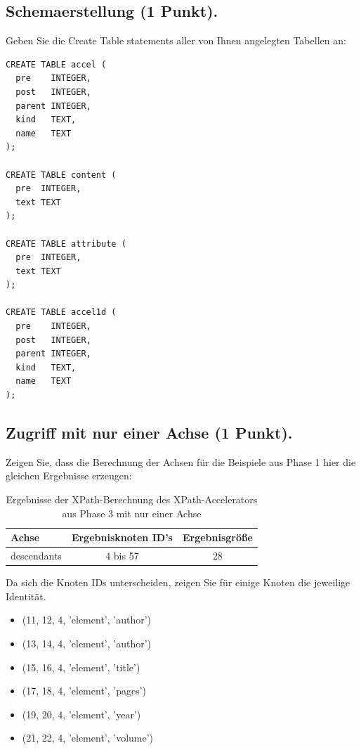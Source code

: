 \documentclass[11pt]{scrartcl}
\begin{document}
\newpage
\subsection*{Schemaerstellung (1 Punkt).}
Geben Sie die Create Table statements aller von Ihnen angelegten Tabellen an:
\begin{lstlisting}[style=dmrsql]
CREATE TABLE accel (
  pre    INTEGER,
  post   INTEGER,
  parent INTEGER,
  kind   TEXT,
  name   TEXT
);

CREATE TABLE content (
  pre  INTEGER,
  text TEXT
);

CREATE TABLE attribute (
  pre  INTEGER,
  text TEXT
);

CREATE TABLE accel1d (
  pre    INTEGER,
  post   INTEGER,
  parent INTEGER,
  kind   TEXT,
  name   TEXT
);

\end{lstlisting}
\newpage
\subsection*{Zugriff mit nur einer Achse (1 Punkt).}
Zeigen Sie, dass die Berechnung der Achsen für die Beispiele aus Phase 1 hier die gleichen Ergebnisse erzeugen:

\begin{table}[h]
	\centering
		\begin{center}
			\begin{tabular}{ l | c c }
				\toprule
				Achse & Ergebnisknoten ID's & Ergebnisgröße\\
				\midrule
				descendants & 4 bis 57 & 28 \\
				\bottomrule
			\end{tabular}
			\end{center}
	\caption{Ergebnisse der XPath-Berechnung des XPath-Accelerators aus Phase 3 mit nur einer Achse}
	\label{tab:ErgebnisseDerXPathBerechnug}
\end{table}

Da sich die Knoten IDs unterscheiden, zeigen Sie für einige Knoten die jeweilige Identität.

\begin{itemize}
    \item  (11, 12, 4, 'element', 'author')
   \item(13, 14, 4, 'element', 'author')
   \item(15, 16, 4, 'element', 'title')
   \item(17, 18, 4, 'element', 'pages')
   \item(19, 20, 4, 'element', 'year')
   \item(21, 22, 4, 'element', 'volume')
\end{itemize}
\end{document}
